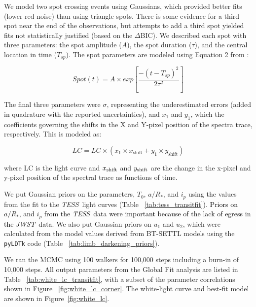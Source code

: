 \documentclass[twocolumn]{aastex63} %
\newcommand{\tess}{\textit{TESS}}
\newcommand{\jwst}{\textit{JWST}}
\newcommand{\newedit}[1]{\textcolor{black}{#1}}
\begin{document}
We model two spot crossing events using Gaussians, which provided better fits (lower red noise) than using triangle spots. There is some evidence for a third spot near the end of the observations, but attempts to add a third spot yielded fits not statistically justified (based on the $\Delta$BIC). We described each spot with three parameters: the spot amplitude ($A$), the spot duration ($\tau$), and the central location in time ($T_{sp}$). The spot parameters are modeled using Equation 2 from \citet{Dai2017}:

\begin{equation}
Spot (t)  = A \times exp \left[ \frac{-(t-T_{sp})^2}{2\tau^{2}}\right]
\end{equation}

The final three parameters were $\sigma$, representing the underestimated errors (added in quadrature with the reported uncertainties), and $x_1$ and $y_1$, which the coefficients governing the shifts in the X and Y-pixel position of the spectra trace, respectively. This is modeled as: 

\begin{equation}
    LC = LC \times (x_{1} \times x_\textrm{shift} + y_{1} \times y_\textrm{shift})
\end{equation}

\noindent where LC is the light curve and $x_{\rm shift}$ and $y_{\rm shift}$ are the change in the x-pixel and y-pixel position of the spectral trace as functions of time. 

We put Gaussian priors on the parameters, $T_0$, $a/R_{*}$, and $i_p$ using the values from the fit to the \tess\, light curves (Table ~\ref{tab:tess_transitfit}). \newedit{Priors on $a/R_{*}$, and $i_p$ from the \tess\ data were important because of the lack of egress in the \jwst\ data}. We also put Gaussian priors on $u_{1}$ and $u_{2}$, which were calculated from the model values derived from BT-SETTL models using the \texttt{pyLDTk} code \citep{Parviainen2015} (Table ~\ref{tab:limb_darkening_priors}).

We ran the MCMC using 100 walkers for 100,000 steps including a burn-in of 10,000 steps. All output parameters from the Global Fit analysis are listed in Table ~\ref{tab:white_lc_transitfit}, with a subset of the parameter correlations shown in Figure ~\ref{fig:white_lc_corner}. The white-light curve and best-fit model are shown in Figure~\ref{fig:white_lc}. 
\end{document}
